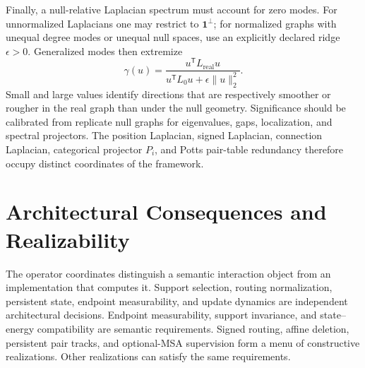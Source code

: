 \documentclass[10pt]{article}
\theoremstyle{definition}
\theoremstyle{remark}
\newcommand{\BookPart}[1]{}
\newcommand{\BookChapter}[1]{\section{#1}}
\newcommand{\BookInsert}[1]{}
\newcommand{\BookChapterLabel}[1]{}
\begin{document}
Finally, a null-relative Laplacian spectrum must account for zero modes.  For unnormalized
Laplacians one may restrict to $\mathbf1^\perp$; for normalized graphs with unequal degree modes or
unequal null spaces, use an explicitly declared ridge $\epsilon>0$.  Generalized modes then
extremize
\begin{equation}
\gamma(u)
=\frac{u^{\mathsf T}L_{\mathrm{real}}u}
{u^{\mathsf T}L_0u+\epsilon\|u\|_2^2}.
\label{eq:null-laplacian-rayleigh}
\end{equation}
Small and large values identify directions that are respectively smoother or rougher in the real
graph than under the null geometry.  Significance should be calibrated from replicate null graphs
for eigenvalues, gaps, localization, and spectral projectors.  The position Laplacian, signed
Laplacian, connection Laplacian, categorical projector $P_i$, and Potts pair-table redundancy
therefore occupy distinct coordinates of the framework.

\BookInsert{chapters/09_coda}
\BookPart{Realizability, Evidence, and Interpretation}
\BookChapter{Architectural Consequences and Realizability}
\BookChapterLabel{chap:book-architecture}
\BookInsert{chapters/10_opening}

The operator coordinates distinguish a semantic interaction object from an implementation that
computes it.  Support selection, routing normalization, persistent state, endpoint measurability,
and update dynamics are independent architectural decisions.  Endpoint measurability, support
invariance, and state--energy compatibility are semantic requirements.  Signed routing, affine
deletion, persistent pair tracks, and optional-MSA supervision form a menu of constructive
realizations.  Other realizations can satisfy the same requirements.
\end{document}
